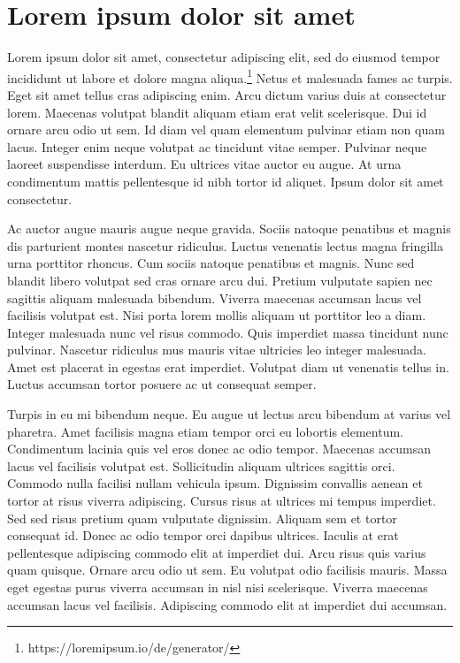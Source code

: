 \documentclass{article}
\begin{document}
\section{Lorem ipsum dolor sit amet}

Lorem ipsum dolor sit amet, consectetur adipiscing elit, sed do eiusmod tempor incididunt ut labore et dolore magna aliqua.\footnote{https://loremipsum.io/de/generator/} Netus et malesuada fames ac turpis. Eget sit amet tellus cras adipiscing enim. Arcu dictum varius duis at consectetur lorem. Maecenas volutpat blandit aliquam etiam erat velit scelerisque. Dui id ornare arcu odio ut sem. Id diam vel quam elementum pulvinar etiam non quam lacus. Integer enim neque volutpat ac tincidunt vitae semper. Pulvinar neque laoreet suspendisse interdum. Eu ultrices vitae auctor eu augue. At urna condimentum mattis pellentesque id nibh tortor id aliquet. Ipsum dolor sit amet consectetur.

Ac auctor augue mauris augue neque gravida. Sociis natoque penatibus et magnis dis parturient montes nascetur ridiculus. Luctus venenatis lectus magna fringilla urna porttitor rhoncus. Cum sociis natoque penatibus et magnis. Nunc sed blandit libero volutpat sed cras ornare arcu dui. Pretium vulputate sapien nec sagittis aliquam malesuada bibendum. Viverra maecenas accumsan lacus vel facilisis volutpat est. Nisi porta lorem mollis aliquam ut porttitor leo a diam. Integer malesuada nunc vel risus commodo. Quis imperdiet massa tincidunt nunc pulvinar. Nascetur ridiculus mus mauris vitae ultricies leo integer malesuada. Amet est placerat in egestas erat imperdiet. Volutpat diam ut venenatis tellus in. Luctus accumsan tortor posuere ac ut consequat semper.

Turpis in eu mi bibendum neque. Eu augue ut lectus arcu bibendum at varius vel pharetra. Amet facilisis magna etiam tempor orci eu lobortis elementum. Condimentum lacinia quis vel eros donec ac odio tempor. Maecenas accumsan lacus vel facilisis volutpat est. Sollicitudin aliquam ultrices sagittis orci. Commodo nulla facilisi nullam vehicula ipsum. Dignissim convallis aenean et tortor at risus viverra adipiscing. Cursus risus at ultrices mi tempus imperdiet. Sed sed risus pretium quam vulputate dignissim. Aliquam sem et tortor consequat id. Donec ac odio tempor orci dapibus ultrices. Iaculis at erat pellentesque adipiscing commodo elit at imperdiet dui. Arcu risus quis varius quam quisque. Ornare arcu odio ut sem. Eu volutpat odio facilisis mauris. Massa eget egestas purus viverra accumsan in nisl nisi scelerisque. Viverra maecenas accumsan lacus vel facilisis. Adipiscing commodo elit at imperdiet dui accumsan.
\end{document}
